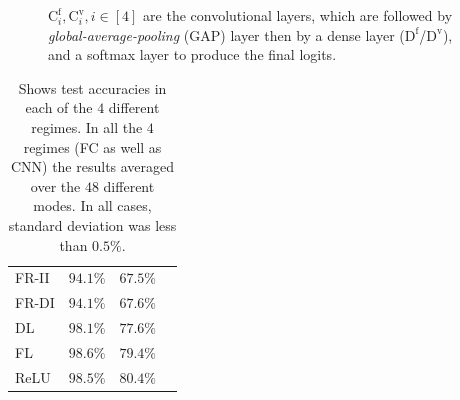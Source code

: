 \FloatBarrier
\begin{figure}[h]
\caption{\small{$\textrm{C}_i^{\text{f}},\textrm{C}_i^{\text{v}},i\in[4]$ are the convolutional layers, which are followed by \emph{global-average-pooling} (GAP) layer then by a dense layer ($\textrm{D}^{\text{f}}$/$\textrm{D}^{\text{v}}$), and a softmax layer to produce the final logits.}} %
\label{fig:ablation}
\end{figure}
\FloatBarrier
\begin{table}[h]
\centering
\begin{tabular}{|p{1cm}|p{1.6cm}|p{1.7cm}p{0.001cm}|}\hline
&\centering{FC (MNIST)}& \centering{CNN (CIFAR-10)}& \\\hline
FR-II& \centering$94.1\%$ & \centering$67.5\%$& \\\hline
FR-DI& \centering$94.1\%$ & \centering$67.6\%$& \\\hline
DL& \centering$98.1\%$ & \centering$77.6\%$&\\\hline
FL& \centering$98.6\%$ & \centering$79.4\%$&\\\hline
ReLU& \centering$98.5\%$ & \centering$80.4\%$&\\\hline
\end{tabular}
\caption{Shows test accuracies in each of the $4$ different regimes. In all the $4$ regimes (FC as well as CNN) the results averaged over the $48$ different modes. In all cases, standard deviation was less than $0.5\%$.}
\end{table}
